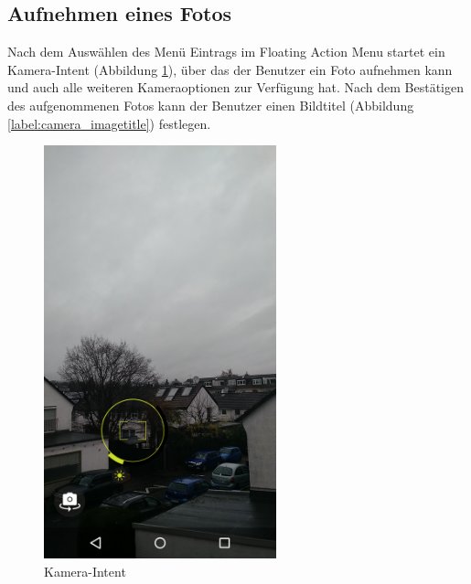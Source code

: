 \subsection{Aufnehmen eines Fotos}
Nach dem Auswählen des Menü Eintrags im Floating Action Menu startet ein Kamera-Intent (Abbildung \ref{label:camera}), über das der Benutzer ein Foto aufnehmen kann und auch alle weiteren Kameraoptionen zur Verfügung hat. Nach dem Bestätigen des aufgenommenen Fotos kann der Benutzer einen Bildtitel (Abbildung \ref{label:camera_imagetitle}) festlegen.
\begin{figure}[H]
\centering
	\begin{minipage}{0.4\textwidth} 
	\centering
	\includegraphics[width=0.6\textwidth]{images/screenshots/camera.png}
	\caption{Kamera-Intent}
	\label{label:camera}
	\end{minipage}
	\hfill
	\begin{minipage}{0.4\textwidth}
	\centering

\end{minipage}
\end{figure}
